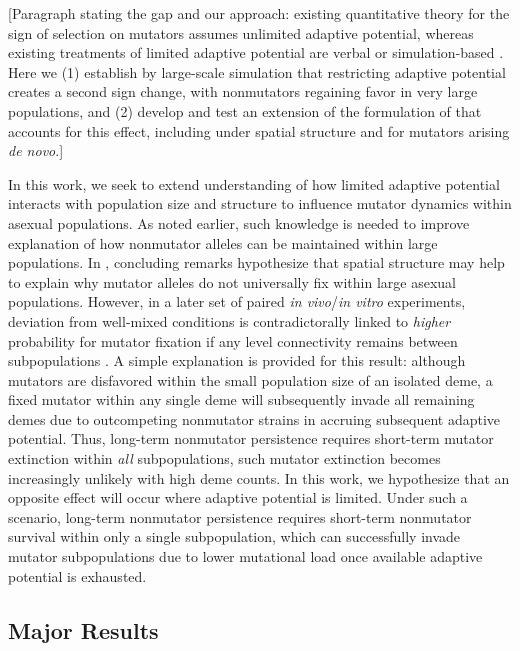 [Paragraph stating the gap and our approach: existing quantitative theory for the sign of selection on mutators \citep{raynes2018sign} assumes unlimited adaptive potential, whereas existing treatments of limited adaptive potential are verbal \citep{desai2011balance} or simulation-based \citep{tenaillon1999mutators,tanaka2003evolution}.
Here we (1) establish by large-scale simulation that restricting adaptive potential creates a second sign change, with nonmutators regaining favor in very large populations, and (2) develop and test an extension of the formulation of \citet{raynes2018sign} that accounts for this effect, including under spatial structure and for mutators arising \textit{de novo}.]

In this work, we seek to extend understanding of how limited adaptive potential interacts with population size and structure to influence mutator dynamics within asexual populations.
As noted earlier, such knowledge is needed to improve explanation of how nonmutator alleles can be maintained within large populations.
In \citep{raynes2018sign}, concluding remarks hypothesize that spatial structure may help to explain why mutator alleles do not universally fix within large asexual populations.
However, in a later set of paired \textit{in vivo}/\textit{in vitro} experiments, deviation from well-mixed conditions is contradictorally linked to \textit{higher} probability for mutator fixation if any level connectivity remains between subpopulations \citep{raynes2019migration}.
A simple explanation is provided for this result: although mutators are disfavored within the small population size of an isolated deme, a fixed mutator within any single deme will subsequently invade all remaining demes due to outcompeting nonmutator strains in accruing subsequent adaptive potential.
Thus, long-term nonmutator persistence requires short-term mutator extinction within \textit{all} subpopulations, such mutator extinction becomes increasingly unlikely with high deme counts.
In this work, we hypothesize that an opposite effect will occur where adaptive potential is limited.
Under such a scenario, long-term nonmutator persistence requires short-term nonmutator survival within only a single subpopulation, which can successfully invade mutator subpopulations due to lower mutational load once available adaptive potential is exhausted.

\subsection{Major Results}

